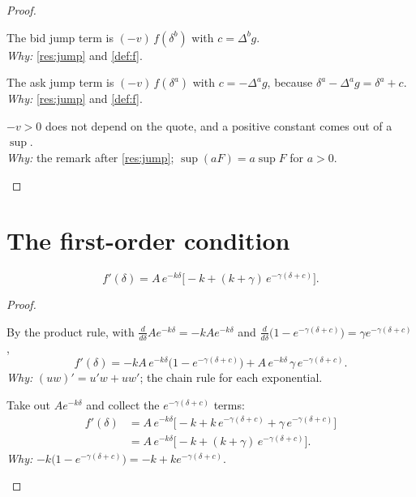 \begin{proof}
\begin{steps}
  \item The bid jump term is $(-v)\,f(\delta^b)$ with $c=\Delta^bg$.
  \\ \emph{Why:} \cref{res:jump} and \cref{def:f}.
  \item The ask jump term is $(-v)\,f(\delta^a)$ with $c=-\Delta^ag$, because $\delta^a-\Delta^ag=\delta^a+c$.
  \\ \emph{Why:} \cref{res:jump} and \cref{def:f}.
  \item $-v>0$ does not depend on the quote, and a positive constant comes out of a $\sup$.
  \\ \emph{Why:} the remark after \cref{res:jump}; $\sup(aF)=a\sup F$ for $a>0$.
\end{steps}
\end{proof}

\section{The first-order condition}

\begin{result}[Derivative of $f$]
\label{res:fprime}
\[
  f'(\delta)=A\,e^{-k\delta}\Big[-k+(k+\gamma)\,e^{-\gamma(\delta+c)}\Big].
\]
\end{result}

\begin{proof}
\begin{steps}
  \item By the product rule, with $\frac{d}{d\delta}Ae^{-k\delta}=-kAe^{-k\delta}$ and $\frac{d}{d\delta}\big(1-e^{-\gamma(\delta+c)}\big)=\gamma e^{-\gamma(\delta+c)}$,
  \[
    f'(\delta)=-kA\,e^{-k\delta}\Big(1-e^{-\gamma(\delta+c)}\Big)+A\,e^{-k\delta}\,\gamma\,e^{-\gamma(\delta+c)}.
  \]
  \emph{Why:} $(uw)'=u'w+uw'$; the chain rule for each exponential.
  \item Take out $Ae^{-k\delta}$ and collect the $e^{-\gamma(\delta+c)}$ terms:
  \[
    \begin{aligned}
      f'(\delta)&=A\,e^{-k\delta}\Big[-k+k\,e^{-\gamma(\delta+c)}+\gamma\,e^{-\gamma(\delta+c)}\Big]\\
      &=A\,e^{-k\delta}\Big[-k+(k+\gamma)\,e^{-\gamma(\delta+c)}\Big].
    \end{aligned}
  \]
  \emph{Why:} $-k\big(1-e^{-\gamma(\delta+c)}\big)=-k+ke^{-\gamma(\delta+c)}$.
\end{steps}
\end{proof}

